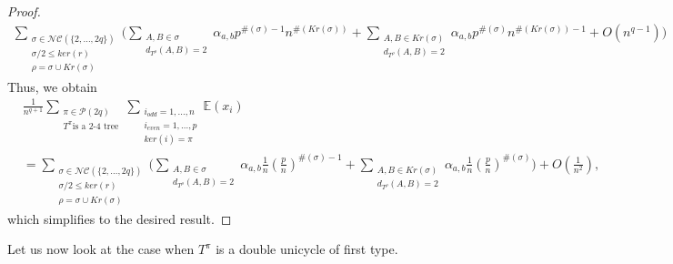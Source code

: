 \documentclass{article}
\theoremstyle{definition}
\newcommand{\E}{\mathbb{E}}
\newcommand{\cP}{\mathcal{P}}
\newcommand{\NC}{\mathcal{NC}}
\begin{document}
{\begin{proof}
\begin{multline}
\sum_{\substack{\sigma\in \NC(\{2,\dots,2q\}) \\ \sigma/2\leq ker(r) \\ \rho=\sigma\cup Kr(\sigma)}}\Bigg(\sum_{\substack{A,B\in \sigma \\ d_{T^\rho}(A,B)=2}}\alpha_{a,b}p^{\#(\sigma)-1}n^{\#(Kr(\sigma))} + \sum_{\substack{A,B\in Kr(\sigma) \\ d_{T^\rho}(A,B)=2}}\alpha_{a,b}p^{\#(\sigma)}n^{\#(Kr(\sigma))-1}+O(n^{q-1})\Bigg)
\end{multline}
Thus, we obtain
\begin{align*}
&\frac{1}{n^{q+1}}\sum_{\substack{\pi\in \cP(2q)\\ T^\pi \text{is a 2-4 tree} }}\sum_{\substack{i_{odd}=1,\dots,n \\ i_{even}=1,\dots,p \\ ker(i)=\pi}}\E(x_i) \\ 
&= \sum_{\substack{\sigma\in \NC(\{2,\dots,2q\}) \\ \sigma/2\leq ker(r) \\ \rho=\sigma\cup Kr(\sigma)}}\Bigg(\sum_{\substack{A,B\in \sigma \\ d_{T^\rho}(A,B)=2}}\alpha_{a,b}\frac{1}{n}\left(\frac{p}{n}\right)^{\#(\sigma)-1} + \sum_{\substack{A,B\in Kr(\sigma) \\ d_{T^\rho}(A,B)=2}}\alpha_{a,b}\frac{1}{n}\left(\frac{p}{n}\right)^{\#(\sigma)}\Bigg)+O(\frac{1}{n^2}),
\end{align*}
which simplifies to the desired result.
\end{proof}

Let us now look at the case when $T^\pi$ is a double unicycle of first type.

}
\end{document}
